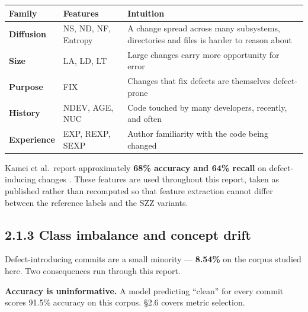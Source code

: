 \begin{longtable}[]{@{}
  >{\raggedright\arraybackslash}p{}
  >{\raggedright\arraybackslash}p{}
  >{\raggedright\arraybackslash}p{}@{}}
\toprule\noalign{}
\begin{minipage}[b]{\linewidth}\raggedright
Family
\end{minipage} & \begin{minipage}[b]{\linewidth}\raggedright
Features
\end{minipage} & \begin{minipage}[b]{\linewidth}\raggedright
Intuition
\end{minipage} \\
\midrule\noalign{}
\endhead
\bottomrule\noalign{}
\endlastfoot
\textbf{Diffusion} & NS, ND, NF, Entropy & A change spread across many
subsystems, directories and files is harder to reason about \\
\textbf{Size} & LA, LD, LT & Large changes carry more opportunity for
error \\
\textbf{Purpose} & FIX & Changes that fix defects are themselves
defect-prone \\
\textbf{History} & NDEV, AGE, NUC & Code touched by many developers,
recently, and often \\
\textbf{Experience} & EXP, REXP, SEXP & Author familiarity with the code
being changed \\
\end{longtable}

Kamei et al.~report approximately \textbf{68\% accuracy and 64\% recall}
on defect-inducing changes \citep{kamei2013jit}. These features are used
throughout this report, taken as published rather than recomputed so
that feature extraction cannot differ between the reference labels and
the SZZ variants.

\subsection{2.1.3 Class imbalance and concept
drift}\label{class-imbalance-and-concept-drift}

Defect-introducing commits are a small minority --- \textbf{8.54\%} on
the corpus studied here. Two consequences run through this report.

\textbf{Accuracy is uninformative.} A model predicting ``clean'' for
every commit scores 91.5\% accuracy on this corpus. \S{}2.6 covers metric
selection.

